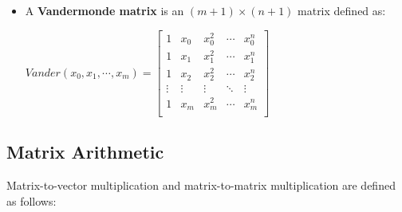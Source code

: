 \begin{tcolorbox}[title={\textbf{\tboxdef{\ref*{subsec:vandermonde}} Matrices}}]
\begin{itemize}
$ $


\item A \textbf{Vandermonde matrix} is an $(m + 1) \times (n + 1)$ matrix defined as:

$\mathit{Vander}(x_0, x_1, \cdots, x_{m}) = \begin{bmatrix}
1 & x_0 & x_0^2 & \cdots & x_0^n\\
1 & x_1 & x_1^2 & \cdots & x_1^n \\
1 & x_2 & x_2^2 & \cdots & x_2^n \\
\vdots & \vdots & \vdots & \ddots & \vdots \\
1 & x_m & x_m^2 & \cdots & x_m^{n} \\
\end{bmatrix}$


\end{itemize}

\end{tcolorbox}


 





\subsection{Matrix Arithmetic}
\label{subsec:matrix-arithmetic}


Matrix-to-vector multiplication and matrix-to-matrix multiplication are defined as follows:




